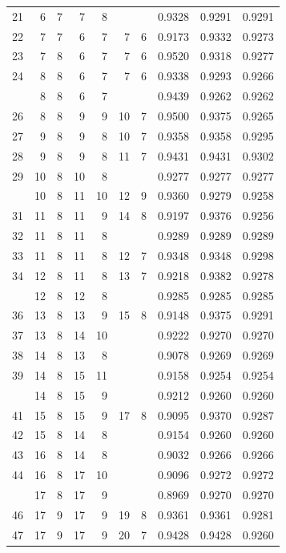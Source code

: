 \begin{Schunk}
\begin{longtable}{rrrrrrrrrr}
21 & 6 & 7 & 7 & 8 &  &  & 0.9328 & 0.9291 & 0.9291\\
22 & 7 & 7 & 6 & 7 & 7 & 6 & 0.9173 & 0.9332 & 0.9273\\
23 & 7 & 8 & 6 & 7 & 7 & 6 & 0.9520 & 0.9318 & 0.9277\\
24 & 8 & 8 & 6 & 7 & 7 & 6 & 0.9338 & 0.9293 & 0.9266\\
\addlinespace
25 & 8 & 8 & 6 & 7 &  &  & 0.9439 & 0.9262 & 0.9262\\
26 & 8 & 8 & 9 & 9 & 10 & 7 & 0.9500 & 0.9375 & 0.9265\\
27 & 9 & 8 & 9 & 8 & 10 & 7 & 0.9358 & 0.9358 & 0.9295\\
28 & 9 & 8 & 9 & 8 & 11 & 7 & 0.9431 & 0.9431 & 0.9302\\
29 & 10 & 8 & 10 & 8 &  &  & 0.9277 & 0.9277 & 0.9277\\
\addlinespace
30 & 10 & 8 & 11 & 10 & 12 & 9 & 0.9360 & 0.9279 & 0.9258\\
31 & 11 & 8 & 11 & 9 & 14 & 8 & 0.9197 & 0.9376 & 0.9256\\
32 & 11 & 8 & 11 & 8 &  &  & 0.9289 & 0.9289 & 0.9289\\
33 & 11 & 8 & 11 & 8 & 12 & 7 & 0.9348 & 0.9348 & 0.9298\\
34 & 12 & 8 & 11 & 8 & 13 & 7 & 0.9218 & 0.9382 & 0.9278\\
\addlinespace
35 & 12 & 8 & 12 & 8 &  &  & 0.9285 & 0.9285 & 0.9285\\
36 & 13 & 8 & 13 & 9 & 15 & 8 & 0.9148 & 0.9375 & 0.9291\\
37 & 13 & 8 & 14 & 10 &  &  & 0.9222 & 0.9270 & 0.9270\\
38 & 14 & 8 & 13 & 8 &  &  & 0.9078 & 0.9269 & 0.9269\\
39 & 14 & 8 & 15 & 11 &  &  & 0.9158 & 0.9254 & 0.9254\\
\addlinespace
40 & 14 & 8 & 15 & 9 &  &  & 0.9212 & 0.9260 & 0.9260\\
41 & 15 & 8 & 15 & 9 & 17 & 8 & 0.9095 & 0.9370 & 0.9287\\
42 & 15 & 8 & 14 & 8 &  &  & 0.9154 & 0.9260 & 0.9260\\
43 & 16 & 8 & 14 & 8 &  &  & 0.9032 & 0.9266 & 0.9266\\
44 & 16 & 8 & 17 & 10 &  &  & 0.9096 & 0.9272 & 0.9272\\
\addlinespace
45 & 17 & 8 & 17 & 9 &  &  & 0.8969 & 0.9270 & 0.9270\\
46 & 17 & 9 & 17 & 9 & 19 & 8 & 0.9361 & 0.9361 & 0.9281\\
47 & 17 & 9 & 17 & 9 & 20 & 7 & 0.9428 & 0.9428 & 0.9260\\

\end{longtable}
\end{Schunk}
